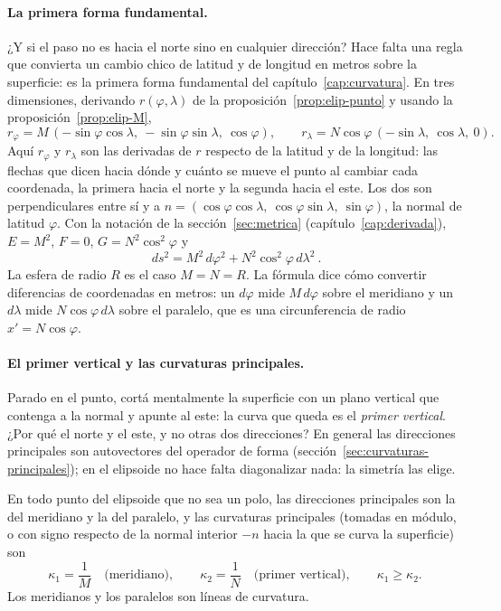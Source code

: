 \paragraph{La primera forma fundamental.} ¿Y si el paso no es hacia el norte sino en
cualquier dirección? Hace falta una regla que convierta un cambio chico de latitud y de
longitud en metros sobre la superficie: es la primera forma fundamental del
capítulo~\ref{cap:curvatura}. En tres dimensiones, derivando
\(r(\varphi,\lambda)\) de la proposición~\ref{prop:elip-punto} y usando la
proposición~\ref{prop:elip-M},
\[
  r_\varphi=M\,(-\sin\varphi\cos\lambda,\ -\sin\varphi\sin\lambda,\ \cos\varphi),\qquad
  r_\lambda=N\cos\varphi\,(-\sin\lambda,\ \cos\lambda,\ 0).
\]
Aquí \(r_\varphi\) y \(r_\lambda\) son las derivadas de \(r\) respecto de la latitud y de la
longitud: las flechas que dicen hacia dónde y cuánto se mueve el punto al cambiar cada
coordenada, la primera hacia el norte y la segunda hacia el este.
Los dos son perpendiculares entre sí y a \(n=(\cos\varphi\cos\lambda,\ \cos\varphi\sin\lambda,\
\sin\varphi)\), la normal de latitud \(\varphi\). Con la notación de la
sección~\ref{sec:metrica} (capítulo~\ref{cap:derivada}), \(E=M^2\), \(F=0\),
\(G=N^2\cos^2\varphi\) y
\[
  \boxed{\ ds^2=M^2\,d\varphi^2+N^2\cos^2\varphi\,d\lambda^2\ }.
\]
La esfera de radio \(R\) es el caso \(M=N=R\). La fórmula dice cómo convertir diferencias de
coordenadas en metros: un \(d\varphi\) mide \(M\,d\varphi\) sobre el meridiano y un
\(d\lambda\) mide \(N\cos\varphi\,d\lambda\) sobre el paralelo, que es una circunferencia de
radio \(x'=N\cos\varphi\).

\paragraph{El primer vertical y las curvaturas principales.} Parado en el punto, cortá
mentalmente la superficie con un plano vertical que contenga a la normal y apunte al este: la
curva que queda es el \emph{primer vertical}. ¿Por qué el norte y el este, y no otras dos
direcciones? En general las direcciones
principales son autovectores del operador de forma (sección~\ref{sec:curvaturas-principales});
en el elipsoide no hace falta diagonalizar nada: la simetría las elige.

\begin{proposicion}\label{prop:elip-principales}
En todo punto del elipsoide que no sea un polo, las direcciones principales son la del
meridiano y la del paralelo, y las curvaturas principales (tomadas en módulo, o con signo respecto de la normal interior \(-n\) hacia la que se curva la superficie) son
\[
  \kappa_1=\frac1M\quad\text{(meridiano)},\qquad \kappa_2=\frac1N\quad\text{(primer vertical)},
  \qquad \kappa_1\ge \kappa_2 .
\]
Los meridianos y los paralelos son líneas de curvatura.
\end{proposicion}

